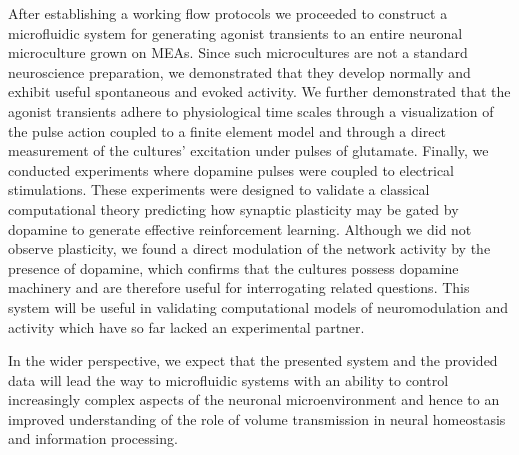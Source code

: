 After establishing a working flow protocols we proceeded to construct a microfluidic system for generating agonist transients to an entire neuronal microculture grown on MEAs. Since such microcultures are not a standard neuroscience preparation, we demonstrated that they develop normally and exhibit useful spontaneous and evoked activity. We further demonstrated that the agonist transients adhere to physiological time scales through a visualization of the pulse action coupled to a finite element model and through a direct measurement of the cultures' excitation under pulses of glutamate. Finally, we conducted experiments where dopamine pulses were coupled to electrical stimulations. These experiments were designed to validate a classical computational theory predicting how synaptic plasticity may be gated by dopamine to generate effective reinforcement learning. Although we did not observe plasticity, we found a direct modulation of the network activity by the presence of dopamine, which confirms that the cultures possess dopamine machinery and are therefore useful for interrogating related questions. This system will be useful in validating computational models of neuromodulation and activity which have so far lacked an experimental partner.

In the wider perspective, we expect that the presented system and the provided data will lead the way to microfluidic systems with an ability to control increasingly complex aspects of the neuronal microenvironment and hence to an improved understanding of the role of volume transmission in neural homeostasis and information processing.

